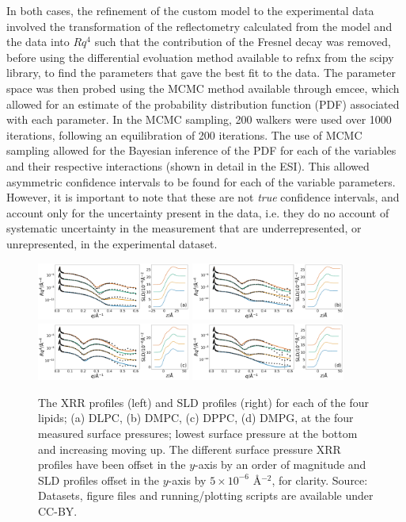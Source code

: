 \documentclass[twoside,twocolumn,9pt]{article}
\begin{document}
In both cases, the refinement of the custom model to the experimental data involved the transformation of the reflectometry calculated from the model and the data into $Rq^4$ such that the contribution of the Fresnel decay was removed, before using the differential evoluation method available to refnx from the scipy library,\cite{Jones2001} to find the parameters that gave the best fit to the data. The parameter space was then probed using the MCMC method available through emcee,\cite{Foreman-Mackey2013} which allowed for an estimate of the probability distribution function (PDF) associated with each parameter. In the MCMC sampling, 200 walkers were used over 1000 iterations, following an equilibration of 200 iterations. The use of MCMC sampling allowed for the Bayesian inference of the PDF for each of the variables and their respective interactions (shown in detail in the ESI). This allowed asymmetric confidence intervals to be found for each of the variable parameters. However, it is important to note that these are not \emph{true} confidence intervals, and account only for the uncertainty present in the data, i.e. they do no account of systematic uncertainty in the measurement that are underrepresented, or unrepresented, in the experimental dataset.

%
\begin{figure}
	\centering
	\includegraphics[width=0.45\textwidth]{figures/dlpc_ref_sld}
	\includegraphics[width=0.45\textwidth]{figures/dmpc_ref_sld}
	\includegraphics[width=0.45\textwidth]{figures/dppc_ref_sld}
	\includegraphics[width=0.45\textwidth]{figures/dmpg_ref_sld}
	\caption{The XRR profiles (left) and SLD profiles (right) for each of the four lipids; (a) DLPC, (b) DMPC, (c) DPPC, (d) DMPG, at the four measured surface pressures; lowest surface pressure at the bottom and increasing moving up. The different surface pressure XRR profiles have been offset in the $y$-axis by an order of magnitude and SLD profiles offset in the $y$-axis by $5\times10^{-6}$ \AA$^{-2}$, for clarity. Source: Datasets, figure files and running/plotting scripts are available under CC-BY.\cite{mccluskey_2018}}
	\label{fig:lipids}
\end{figure}
%
\end{document}

